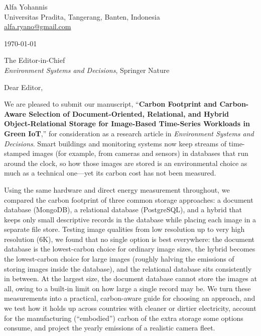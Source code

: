 \documentclass[11pt]{article}
\begin{document}
\pagestyle{empty}

\noindent Alfa Yohannis\\
Universitas Pradita, Tangerang, Banten, Indonesia\\
\href{mailto:alfa.ryano@gmail.com}{alfa.ryano@gmail.com}

\vspace{0.6em}
\noindent \today

\vspace{0.6em}
\noindent The Editor-in-Chief\\
\emph{Environment Systems and Decisions}, Springer Nature

\vspace{0.6em}
\noindent Dear Editor, %

We are pleased to submit our manuscript, ``\textbf{Carbon Footprint and Carbon-Aware
Selection of Document-Oriented, Relational, and Hybrid Object-Relational Storage for
Image-Based Time-Series Workloads in Green IoT},'' for consideration as a research article
in \emph{Environment Systems and Decisions}. Smart buildings and monitoring systems now keep
streams of time-stamped images (for example, from cameras and sensors) in databases that run
around the clock, so how those images are stored is an environmental choice as much as a
technical one---yet its carbon cost has not been measured.

Using the same hardware and direct energy measurement throughout, we compared the carbon
footprint of three common storage approaches: a document database (MongoDB), a relational
database (PostgreSQL), and a hybrid that keeps only small descriptive records in the database
while placing each image in a separate file store. Testing image qualities from low resolution
up to very high resolution (6K), we found that no single option is best everywhere: the
document database is the lowest-carbon choice for ordinary image sizes, the hybrid becomes the
lowest-carbon choice for large images (roughly halving the emissions of storing images inside
the database), and the relational database sits consistently in between. At the largest size,
the document database cannot store the images at all, owing to a built-in limit on how large a
single record may be. We turn these measurements into a practical, carbon-aware guide for
choosing an approach, and we test how it holds up across countries with cleaner or dirtier
electricity, account for the manufacturing (``embodied'') carbon of the extra storage some
options consume, and project the yearly emissions of a realistic camera fleet.
\end{document}
